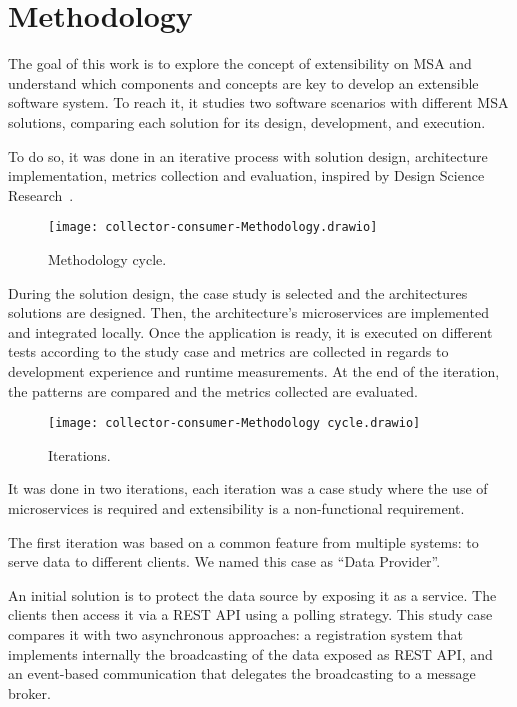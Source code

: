 
\chapter{Methodology}

The goal of this work is to explore the concept of extensibility on MSA and understand which components and concepts are key to develop an extensible software system. To reach it, it studies two software scenarios with different MSA solutions, comparing each solution for its design, development, and execution.

To do so, it was done in an iterative process with solution design, architecture implementation, metrics collection and evaluation, inspired by Design Science Research~\cite{DesignParad}.

\begin{figure}
    \centering
    \texttt{[image: collector-consumer-Methodology.drawio]}
    \caption{Methodology cycle.\label{fig:subfigures1}}
\end{figure}

During the solution design, the case study is selected and the architectures solutions are designed. Then, the architecture's microservices are implemented and integrated locally. Once the application is ready, it is executed on different tests according to the study case and metrics are collected in regards to development experience and runtime measurements. At the end of the iteration, the patterns are compared and the metrics collected are evaluated.

\begin{figure}
    \centering
    \texttt{[image: collector-consumer-Methodology cycle.drawio]}
    \caption{Iterations.\label{fig:subfigures2}}
\end{figure}

It was done in two iterations, each iteration was a case study where the use of microservices is required and extensibility is a non-functional requirement.

The first iteration was based on a common feature from multiple systems: to serve data to different clients. We named this case as “Data Provider”.

An initial solution is to protect the data source by exposing it as a service. The clients then access it via a REST API using a polling strategy. This study case compares it with two asynchronous approaches: a registration system that implements internally the broadcasting of the data exposed as REST API, and an event-based communication that delegates the broadcasting to a message broker.

